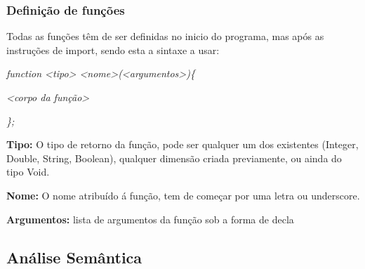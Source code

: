 \documentclass[10pt,portuguese]{article}
\begin{document}
\subsubsection{Definição de funções}
\par Todas as funções têm de ser definidas no inicio do programa, mas após as instruções de import, sendo esta a sintaxe a usar:

\par \textit{function <tipo> <nome>(<argumentos>)\{}
\par \textit{<corpo da função>}
\par \textit{\};}

\newline
\par \textbf{Tipo:} O tipo de retorno da função, pode ser qualquer um dos existentes (Integer, Double, String, Boolean), qualquer dimensão criada previamente, ou ainda do tipo Void.
\par \textbf{Nome:} O nome atribuído á função, tem de começar por uma letra ou underscore.
\par \textbf{Argumentos:} lista de argumentos da função sob a forma de decla
\subsection{Análise Semântica}
\end{document}
